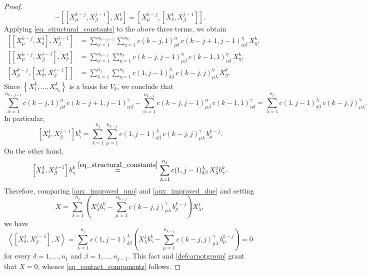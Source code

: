 \documentclass[11pt]{amsart}
\theoremstyle{plain}
\theoremstyle{definition}
\theoremstyle{remark}
\numberwithin{equation}{section}
\begin{document}
\begin{proof}
\begin{equation*}
-
\left[\left[X^{k-j}_\mu,X^{j-1}_\beta\right],X^1_\delta\right]
=
\left[X^{k-j}_\mu,\left[X^1_\delta,X^{j-1}_\beta\right]\right].
\end{equation*}
Applying \eqref{eq_structural_constants} to the above three terms, we obtain
\begin{align*}
\left[\left[X^{k-j}_\mu,X^1_\delta\right],X^{j-1}_\beta\right]
&=
\sum_{\alpha=1}^{n_{k-j+1}}
\sum_{\eta=1}^{n_k}
c(k-j,1)^\alpha_{\mu\delta} \,
c(k-j+1,j-1)^\eta_{\alpha\beta} \,
X^k_\eta,
\\
\left[\left[X^{k-j}_\mu,X^{j-1}_\beta\right],X^1_\delta\right]
&=
\sum_{\alpha=1}^{n_{k-1}}
\sum_{\eta=1}^{n_k}
c(k-j,j-1)^\alpha_{\mu\beta} \,
c(k-1,1)^\eta_{\alpha\delta} \,
X^k_\eta,
\\
\left[X^{k-j}_\mu,\left[X^1_\delta,X^{j-1}_\beta\right]\right]
&=
\sum_{\lambda=1}^{n_j}
\sum_{\eta=1}^{n_k}
c(1,j-1)^\lambda_{\delta\beta} \,
c(k-j,j)^\eta_{\mu\lambda} \,
X^k_\eta.
\end{align*}
Since $\left\{X^k_1,\dots,X^k_{n_k}\right\}$ is a basis for $V_k$, we conclude that 
\begin{equation*}
\sum_{\alpha=1}^{n_{k-j+1}}
c(k-j,1)^\alpha_{\mu\delta} \,
c(k-j+1,j-1)^\gamma_{\alpha\beta}
-
\sum_{\alpha=1}^{n_{k-1}}
c(k-j,j-1)^\alpha_{\mu\beta} \,
c(k-1,1)^\gamma_{\alpha\delta}
=
\sum_{\lambda=1}^{n_j}
c(1,j-1)^\lambda_{\delta\beta} \,
c(k-j,j)^\gamma_{\mu\lambda}.
\end{equation*}
In particular,
\begin{equation}\label{aux_improved_uno}
    \left[X^1_\delta,X^{j-1}_\beta\right]b^k_\gamma
=
\sum_{\lambda=1}^{n_j}
\sum_{\mu=1}^{n_{k-j}}
c(1,j-1)^\lambda_{\delta\beta} \,
c(k-j,j)^\gamma_{\mu\lambda} \,
b^{k-j}_\mu.
\end{equation}
On the other hand,
\begin{equation}\label{aux_improved_due}
\left[X^1_\delta,X^{j-1}_\beta\right]b^k_\gamma\overset{\eqref{eq_structural_constants}}{=}
\sum_{\lambda=1}^{n_j}
c(1,j-1)^\lambda_{\delta\beta} \, X^j_\lambda b^k_\gamma.
\end{equation}
Therefore, comparing \eqref{aux_improved_uno} and \eqref{aux_improved_due} and setting 
\begin{equation*}
    X=\sum_{\lambda=1}^{n_j}
\left(
X^j_\lambda b^k_\gamma
-
\sum_{\mu=1}^{n_{k-j}}
c(k-j,j)^\gamma_{\mu\lambda} \,
b^{k-j}_\mu
\right)X^j_\lambda,
\end{equation*}
we have 
\begin{equation*}
    \left\langle\left[X^1_\delta,X^{j-1}_\beta\right],X\right\rangle=\sum_{\lambda=1}^{n_j}
c(1,j-1)^\lambda_{\delta\beta}
\left(
X^j_\lambda b^k_\gamma
-
\sum_{\mu=1}^{n_{k-j}}
c(k-j,j)^\gamma_{\mu\lambda} \,
b^{k-j}_\mu
\right)=0
\end{equation*}
for every $\delta=1,\ldots,n_1$ and $\beta=1,\ldots,n_{j-1}$. This fact and \eqref{defcarnotgroup} grant that $X=0$, whence \eqref{eq_contact_components} follows.
\end{proof}
\end{document}
